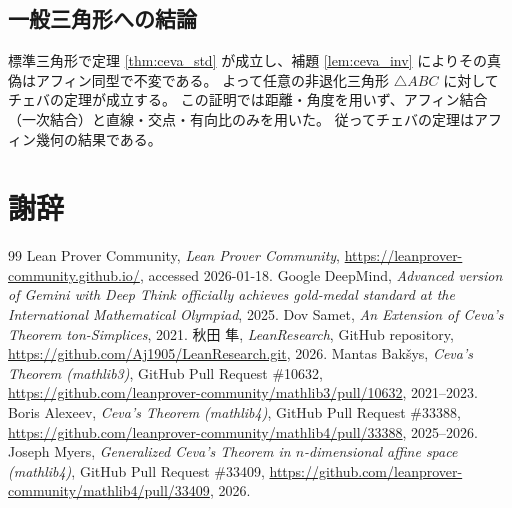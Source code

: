 \documentclass[a4paper,12pt]{bxjsbook}
\newlength{\customindent}
\newenvironment{body}{
  \par
  \begingroup
  \setlength{\leftskip}{\customindent}
  \setlength{\rightskip}{0pt}
  \setlength{\parindent}{1em}
  \setlength{\displayindent}{\customindent}
  \setlength{\displaywidth}{\dimexpr\linewidth-\customindent\relax}
}{
  \par
  \endgroup
}
\theoremstyle{theorem}
\newcommand{\addchaptertotoc}[1]{%
  \chapter*{#1}%
  \addcontentsline{toc}{chapter}{#1}%
}
\begin{document}
    \section{一般三角形への結論}
    \begin{body}
        標準三角形で定理 \ref{thm:ceva_std} が成立し、補題 \ref{lem:ceva_inv} によりその真偽はアフィン同型で不変である。
        よって任意の非退化三角形 $\triangle ABC$ に対してチェバの定理が成立する。
        この証明では距離・角度を用いず、アフィン結合（一次結合）と直線・交点・有向比のみを用いた。
        従ってチェバの定理はアフィン幾何の結果である。
    \end{body}


    

    \backmatter
    \addchaptertotoc{謝辞}
    \begin{body}
    \end{body}

    \begin{thebibliography}{99}
       Lean Prover Community, \emph{Lean Prover Community}, \url{https://leanprover-community.github.io/}, accessed 2026-01-18.
         Google DeepMind, \emph{Advanced version of Gemini with Deep Think officially achieves gold-medal standard at the International Mathematical Olympiad}, 2025.
         Dov Samet, \emph{An Extension of Ceva's Theorem ton-Simplices}, 2021.
         秋田 隼, \emph{LeanResearch}, GitHub repository, \url{https://github.com/Aj1905/LeanResearch.git}, 2026.
         Mantas Bakšys, \emph{Ceva's Theorem (mathlib3)}, GitHub Pull Request \#10632, \url{https://github.com/leanprover-community/mathlib3/pull/10632}, 2021--2023.
         Boris Alexeev, \emph{Ceva's Theorem (mathlib4)}, GitHub Pull Request \#33388, \url{https://github.com/leanprover-community/mathlib4/pull/33388}, 2025--2026.
         Joseph Myers, \emph{Generalized Ceva's Theorem in $n$-dimensional affine space (mathlib4)}, GitHub Pull Request \#33409, \url{https://github.com/leanprover-community/mathlib4/pull/33409}, 2026.
    \end{thebibliography}
\end{document}
